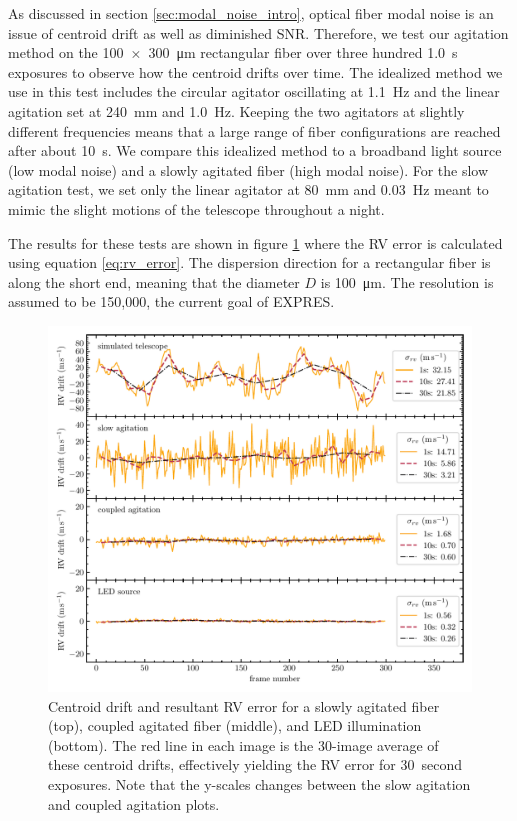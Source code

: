 \documentclass[twocolumn]{emulateapj}
\begin{document}
As discussed in section \ref{sec:modal_noise_intro}, optical fiber modal noise is an issue of centroid drift as well as diminished SNR. Therefore, we test our agitation method on the \SI{100x300}{\micro\meter} rectangular fiber over three hundred \SI{1.0}{\second} exposures to observe how the centroid drifts over time. The idealized method we use in this test includes the circular agitator oscillating at \SI{1.1}{\hertz} and the linear agitation set at \SI{240}{\milli\meter} and \SI{1.0}{\hertz}. Keeping the two agitators at slightly different frequencies means that a large range of fiber configurations are reached after about \SI{10}{\second}. We compare this idealized method to a broadband light source (low modal noise) and a slowly agitated fiber (high modal noise). For the slow agitation test, we set only the linear agitator at \SI{80}{\milli\meter} and \SI{0.03}{\hertz} meant to mimic the slight motions of the telescope throughout a night.

The results for these tests are shown in figure \ref{fig:rv_error} where the RV error is calculated using equation \ref{eq:rv_error}. The dispersion direction for a rectangular fiber is along the short end, meaning that the diameter $D$ is \SI{100}{\micro\meter}. The resolution is assumed to be 150,000, the current goal of EXPRES.


\begin{figure}
\centering
	\includegraphics[width=\textwidth]{images/rv_error.pdf}
	\caption{Centroid drift and resultant RV error for a slowly agitated fiber (top), coupled agitated fiber (middle), and LED illumination (bottom). The red line in each image is the 30-image average of these centroid drifts, effectively yielding the RV error for \SI{30}{second} exposures. Note that the y-scales changes between the slow agitation and coupled agitation plots.}
\label{fig:rv_error}
\end{figure}
\end{document}
